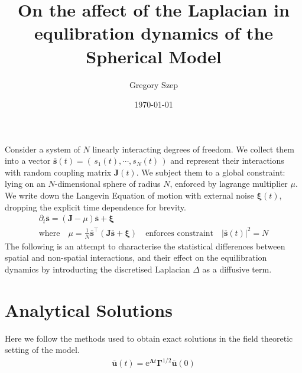 \documentclass{article}[12pt]
\numberwithin{equation}{section}
\begin{document}
\title{
On the affect of the Laplacian in equlibration
dynamics of the Spherical Model
}

\author{Gregory Szep}
\date{\today}

\maketitle
Consider a system of $N$ linearly interacting degrees of freedom. We collect
them into a vector $\bar{\mathbf{s}}(t) = \left(\,s_1(t),\cdots, s_N(t)\,\right)$
and represent their interactions with random coupling matrix $\mathbf{J}(t)$.
We subject them to a global constraint: lying on an $N$-dimensional sphere of
radius $N$, enforced by lagrange multiplier $\mu$. We write down the
Langevin Equation of motion with external noise $\boldsymbol\xi(t)$, dropping
the explicit time dependence for brevity.
\begin{gather}
\partial_t\bar{\mathbf{s}} = (\mathbf{J}-\mu)\bar{\mathbf{s}}+\boldsymbol\xi\quad\\
\text{where}\quad\mu = \frac{1}{N}\bar{\mathbf{s}}^{\top}\left(\mathbf{J}\bar{\mathbf{s}}+\boldsymbol\xi\right)\quad\text{enforces constraint}\quad|\bar{\mathbf{s}}(t)|^2=N
\end{gather}
The following is an attempt to characterise the statistical differences between
spatial and non-spatial interactions, and their effect on the equilibration
dynamics by introducting the discretised Laplacian $\Delta$ as a diffusive term.

\section{Analytical Solutions}
Here we follow the methods used to obtain exact solutions\cite{} in the
field theoretic setting of the model.
\begin{align*}
  \bar{\mathbf{u}}(t)=\mathbb{e}^{\mathbf{\Lambda}t}\mathbf\Gamma^{1/2}\bar{\mathbf{u}}(0)
\end{align*}
\end{document}
